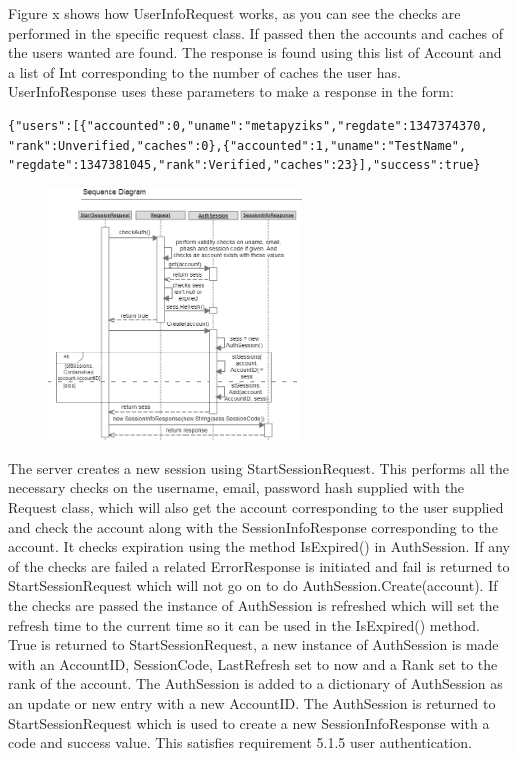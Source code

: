 Figure x shows how UserInfoRequest works, as you can see the checks are performed in the specific request class. If passed then the accounts and caches of the users wanted are found. The response is found using this list of Account and a list of Int corresponding to the number of caches the user has. UserInfoResponse uses these parameters to make a response in the form:

\begin{verbatim}
{"users":[{"accounted":0,"uname":"metapyziks","regdate":1347374370,
"rank":Unverified,"caches":0},{"accounted":1,"uname":"TestName",
"regdate":1347381045,"rank":Verified,"caches":23}],"success":true}
\end{verbatim}

\begin{figure}
    \includegraphics[width=0.6\textwidth]{images/sequence/createSession}
\end{figure}

The server creates a new session using StartSessionRequest. This performs all the necessary checks on the username, email, password hash supplied with the Request class, which will also get the account corresponding to the user supplied and check the account along with the SessionInfoResponse corresponding to the account. It checks expiration using the method IsExpired() in AuthSession. If any of the checks are failed a related ErrorResponse is initiated and fail is returned to StartSessionRequest which will not go on to do AuthSession.Create(account). If the checks are passed the instance of AuthSession is refreshed which will set the refresh time to the current time so it can be used in the IsExpired() method. True is returned to StartSessionRequest, a new instance of AuthSession is made with an AccountID, SessionCode, LastRefresh set to now and a Rank set to the rank of the account. The AuthSession is added to a dictionary of AuthSession as an update or new entry with a new AccountID. The AuthSession is returned to StartSessionRequest which is used to create a new SessionInfoResponse with a code and success value. This satisfies requirement 5.1.5 user authentication.

